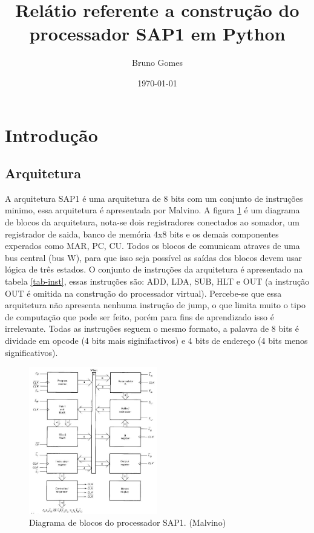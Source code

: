 \documentclass[11pt, twocolumn]{article}
\begin{document}
\title{Relátio referente a construção do processador SAP1 em Python}
\author{Bruno Gomes}
\date{\today}
\section{Introdução}

\subsection{Arquitetura}
   A arquitetura SAP1 é uma arquitetura de 8 bits com um conjunto de instruções minimo, essa arquitetura é apresentada por Malvino. A figura \ref{fig-blocks} é um diagrama de blocos da arquitetura, nota-se dois registradores conectados ao somador, um registrador de saida, banco de memória 4x8 bits e os demais componentes experados como MAR, PC, CU. Todos os blocos de comunicam atraves de uma bus central (bus W), para que isso seja possível as saídas dos blocos devem usar lógica de três estados. O conjunto de instruções da arquitetura é apresentado na tabela \ref{tab-inst}, essas instruções são: ADD, LDA, SUB, HLT e OUT (a instrução OUT é omitida na construção do processador virtual). Percebe-se que essa arquitetura não apresenta nenhuma instrução de jump, o que limita muito o tipo de computação que pode ser feito, porém para fins de aprendizado isso é irrelevante. Todas as instruções seguem o mesmo formato, a palavra de 8 bits é dividade em opcode (4 bits mais siginifactivos) e 4 bits de endereço (4 bits menos significativos).

   \begin{figure}
     \includegraphics[width=0.5\textwidth]{blocks.jpg}
     \caption{Diagrama de blocos do processador SAP1. (Malvino)}
     \label{fig-blocks}
   \end{figure}
   
\end{document}
